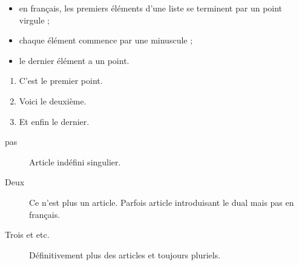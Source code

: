 \documentclass[12pt,a4paper,twoside]{article}
\begin{document}
\begin{itemize}
\item en français, les premiers éléments
d’une liste se terminent par un point
virgule ;
\item chaque élément commence par une
minuscule ;
\item le dernier élément a un point.
\end{itemize}

\begin{enumerate}
\item C’est le premier point.
\item Voici le deuxième.
\item Et enfin le dernier.
\end{enumerate}

\begin{description}
\item[pas] Article indéfini singulier.
\item[Deux] Ce n’est plus un article.
Parfois article introduisant le dual mais
pas en français.
\item[Trois et etc.] Définitivement plus des
articles et toujours pluriels.
\end{description}
\end{document}
